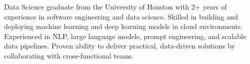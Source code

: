 \vspace{1.350em}
\begin{justify}
Data Science graduate from the University of Houston with 2+ years of experience in software engineering and data science. Skilled in building and deploying machine learning and deep learning models in cloud environments. Experienced in NLP, large language models, prompt engineering, and scalable data pipelines. Proven ability to deliver practical, data-driven solutions by collaborating with cross-functional teams.
\end{justify}

\vspace{-1.350em}